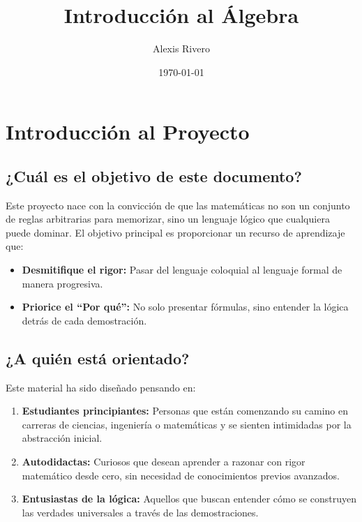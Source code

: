 \documentclass[11pt, oneside]{book}
\title{\Huge \textbf{Introducción al Álgebra} \\}
\author{Alexis Rivero}
\date{\today}
\begin{document}
\frontmatter
\maketitle
\tableofcontents

\chapter*{Introducción al Proyecto}

\section*{¿Cuál es el objetivo de este documento?}

Este proyecto nace con la convicción de que las matemáticas no son un conjunto de reglas arbitrarias para memorizar, sino un lenguaje lógico que cualquiera puede dominar. El objetivo principal es proporcionar un recurso de aprendizaje que:

\begin{itemize}
    \item \textbf{Desmitifique el rigor:} Pasar del lenguaje coloquial al lenguaje formal de manera progresiva.
    \item \textbf{Priorice el ``Por qué'':} No solo presentar fórmulas, sino entender la lógica detrás de cada demostración.
\end{itemize}

\section*{¿A quién está orientado?}

Este material ha sido diseñado pensando en:

\begin{enumerate}
    \item \textbf{Estudiantes principiantes:} Personas que están comenzando su camino en carreras de ciencias, ingeniería o matemáticas y se sienten intimidadas por la abstracción inicial.
    \item \textbf{Autodidactas:} Curiosos que desean aprender a razonar con rigor matemático desde cero, sin necesidad de conocimientos previos avanzados.
    \item \textbf{Entusiastas de la lógica:} Aquellos que buscan entender cómo se construyen las verdades universales a través de las demostraciones.
\end{enumerate}
\end{document}
